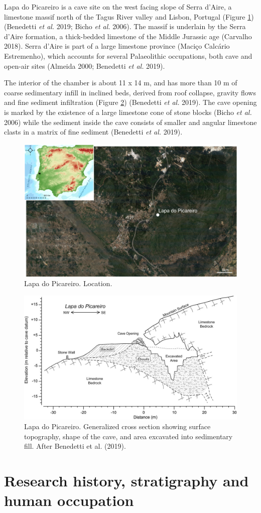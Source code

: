 \documentclass[12pt,twoside]{reedthesis}
\begin{document}
Lapa do Picareiro is a cave site on the west facing slope of Serra d'Aire, a limestone massif north of the Tagus River valley and Lisbon, Portugal (Figure \ref{fig:lpmap}) (Benedetti \emph{et al.} 2019; Bicho \emph{et al.} 2006). The massif is underlain by the Serra d'Aire formation, a thick-bedded limestone of the Middle Jurassic age (Carvalho 2018). Serra d'Aire is part of a large limestone province (Maciço Calcário Estremenho), which accounts for several Palaeolithic occupations, both cave and open-air sites (Almeida 2000; Benedetti \emph{et al.} 2019).

The interior of the chamber is about 11 x 14 m, and has more than 10 m of coarse sedimentary infill in inclined beds, derived from roof collapse, gravity flows and fine sediment infiltration (Figure \ref{fig:lpcave}) (Benedetti \emph{et al.} 2019). The cave opening is marked by the existence of a large limestone cone of stone blocks (Bicho \emph{et al.} 2006) while the sediment inside the cave consists of smaller and angular limestone clasts in a matrix of fine sediment (Benedetti \emph{et al.} 2019).
\begin{figure}

{\centering \includegraphics[width=0.6\linewidth]{figure/picareiro_map} 

}

\caption{Lapa do Picareiro. Location.}\label{fig:lpmap}
\end{figure}
\begin{figure}[H]

{\centering \includegraphics[width=0.6\linewidth]{figure/lp_cross_section} 

}

\caption{Lapa do Picareiro. Generalized cross section showing surface topography, shape of the cave, and area excavated into sedimentary fill. After Benedetti et al. (2019).}\label{fig:lpcave}
\end{figure}
\hypertarget{research-history-stratigraphy-and-human-occupation}{%
\section{Research history, stratigraphy and human occupation}\label{research-history-stratigraphy-and-human-occupation}}
\end{document}
